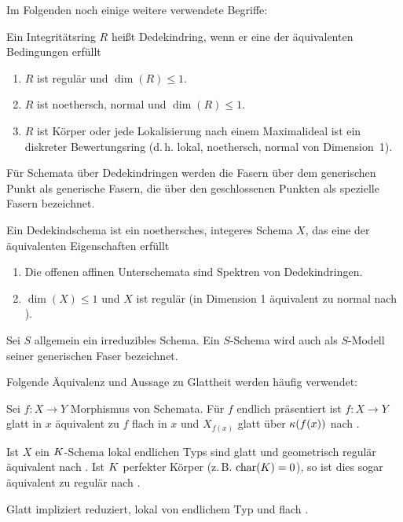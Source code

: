 \documentclass[german, bibliography=totoc]{scrreprt}
\renewcommand*{\optcite}[2][]{}
\begin{document}
Im Folgenden noch einige weitere verwendete Begriffe:

\begin{Definition}[Dedekindring]\label{def:dedekindring}
  \optcite[S.\,40]{hartshorne}\optcite[Definition B.84]{wedhorn}
  Ein Integritätsring $R$ heißt Dedekindring, wenn er eine der
  äquivalenten Bedingungen erfüllt
  \begin{enumerate}[label=(\roman*)]
  \item $R$ ist regulär und $\dim(R)\leq 1$.
  \item $R$ ist noethersch, normal und $\dim(R)\leq 1$.
  \item $R$ ist Körper oder
    jede Lokalisierung nach einem Maximalideal ist ein diskreter
    Bewertungsring
    (d.\,h. lokal, noethersch, normal von Dimension~1).
  \end{enumerate}
\end{Definition}
Für Schemata über Dedekindringen werden die Fasern über dem
generischen Punkt als generische Fasern, die über den geschlossenen
Punkten als spezielle Fasern bezeichnet.
\begin{Definition}[Dedekindschema]
  Ein Dedekindschema ist ein noethersches, integeres Schema $X$, das
  eine der äquivalenten Eigenschaften erfüllt
  \begin{enumerate}[label=(\roman*)]
  \item Die offenen affinen Unterschemata sind Spektren von Dedekindringen.
  \item $\dim(X)\leq 1$ und $X$ ist regulär
    (in Dimension 1 äquivalent zu normal nach
    \cite[Corollary 6.39, Proposition 6.40]{wedhorn}).
  \end{enumerate}
\end{Definition}
Sei $S$ allgemein ein irreduzibles Schema. Ein $S$-Schema wird auch als
$S$-Modell seiner generischen Faser bezeichnet.

Folgende Äquivalenz und Aussage zu Glattheit werden häufig verwendet:
\begin{Bemerkung}\label{thm:eigglatt}
  Sei $f\colon X\to Y$ Morphismus von Schemata.
  Für $f$ endlich präsentiert ist $f\colon X\to Y $ glatt in $x$
  äquivalent zu $f$ flach in $x$ und $X_{f(x)}$ glatt über $\kappa(f(x))$ nach
  \cite[8.5, Proposition 17]{bosch}.
  
  Ist $X$ ein $K$-Schema lokal endlichen Typs sind glatt und
  geometrisch regulär äquivalent nach \cite[Corollary 6.32]{wedhorn}.
  Ist $K$ perfekter Körper (z.\,B. $\operatorname{char}(K)=0$), so ist dies sogar
  äquivalent zu regulär nach \cite[Remark 6.33]{wedhorn}.
    
  Glatt impliziert reduziert, lokal von endlichem Typ und flach
  \cite[für flach s.][Theorem 14.22]{wedhorn}.
\end{Bemerkung}
\end{document}

